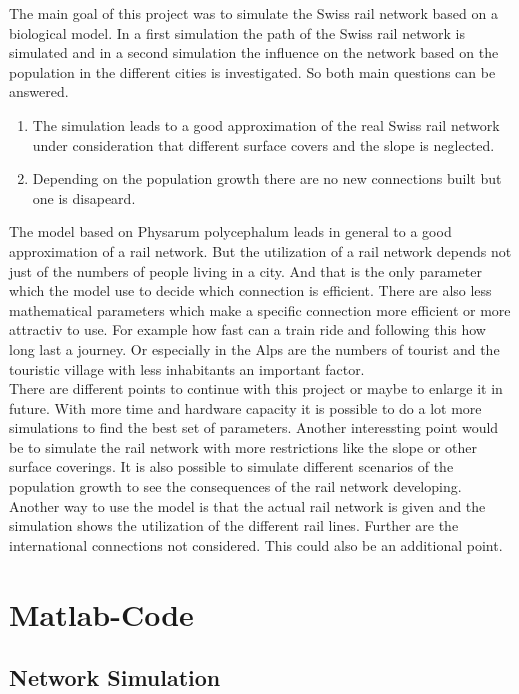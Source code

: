 \documentclass[11pt]{scrartcl}
\begin{document}
The main goal of this project was to simulate the Swiss rail network based on a biological model. In a first simulation the path of the Swiss rail network is simulated and in a second simulation the influence on the network based on the population in the different cities is investigated. So both main questions can be answered.

\begin{enumerate}
\item The simulation leads to a good approximation of the real Swiss rail network under consideration that different surface covers and the slope is neglected.
\item Depending on the population growth there are no new connections built but one is disapeard.
\end{enumerate}

The model based on Physarum polycephalum leads in general to a good approximation of a rail network. But the utilization of a rail network depends not just of the numbers of people living in a city. And that is the only parameter which the model use to decide which connection is efficient. There are also less mathematical parameters which make a specific connection more efficient or more attractiv to use. For example how fast can a train ride and following this how long last a journey. Or especially in the Alps are the numbers of tourist and the touristic village with less inhabitants an important factor.\\

There are different points to continue with this project or maybe to enlarge it in future. With more time and hardware capacity it is possible to do a lot more simulations to find the best set of parameters. Another interessting point would be to simulate the rail network with more restrictions like the slope or other surface coverings. It is also possible to simulate different scenarios of the population growth to see the consequences of the rail network developing. Another way to use the model is that the actual rail network is given and the simulation shows the utilization of the different rail lines.
Further are the international connections not considered. This could also be an additional point.


\newpage
\appendix
\section{Matlab-Code}

\subsection{Network Simulation}
\label{sec:network_simulation}
\end{document}
